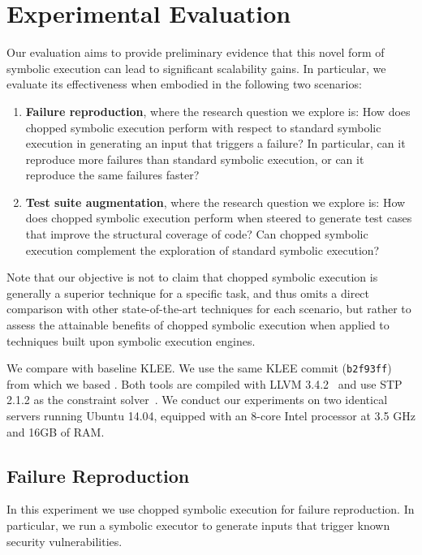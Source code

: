 
\chapter{Experimental Evaluation}\label{chapter:experiments}

Our evaluation aims to provide preliminary evidence that this novel
form of symbolic execution can lead to significant scalability
gains. In particular, we evaluate its effectiveness when embodied in
the following two scenarios:

\begin{enumerate}[leftmargin=*]
\item \textbf{Failure reproduction}, where the research question we
  explore is: How does chopped symbolic execution perform with respect
  to standard symbolic execution in generating an input that triggers
  a failure? In particular, can it reproduce more failures than standard
  symbolic execution, or can it reproduce the same failures faster?

\item \textbf{Test suite augmentation}, where the research question we
  explore is: How does chopped symbolic execution perform when steered
  to generate test cases that improve the structural coverage of code?
  Can chopped symbolic execution complement the exploration of
  standard symbolic execution?
\end{enumerate}

Note that our objective is not to claim that chopped symbolic
execution is generally a superior technique for a specific task,
and thus omits a direct comparison with other state-of-the-art techniques for each scenario,
but rather to assess the attainable benefits of
chopped symbolic execution when applied to techniques built upon
symbolic execution engines.

We compare \toolname with baseline KLEE. We use the same KLEE commit
(\texttt{b2f93ff}) from which we based \toolname.  Both tools are
compiled with LLVM 3.4.2~\cite{llvm} and use STP 2.1.2 as the
constraint solver~\cite{stp}. We conduct our experiments on two
identical servers running Ubuntu 14.04, equipped with an 8-core Intel
processor at 3.5 GHz and 16GB of RAM.

\section{Failure Reproduction}\label{sec:disc-secur-vuln}
In this experiment we use chopped symbolic execution for failure
reproduction. In particular, we run a symbolic executor to generate
inputs that trigger known security vulnerabilities.

